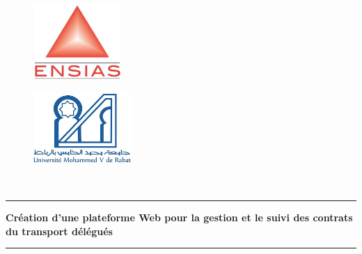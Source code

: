 \documentclass[a4paper]{report}
\begin{document}
\begin{titlepage}
	\begin{center}
		\begin{figure}[!h]
			\vspace{- 2 cm}
			\hspace{ 0 cm}
			\includegraphics[width=9em]{images/ensias.jpeg}
		\end{figure}
		\begin{figure}[!h]
			\vspace{- 3.34cm}
			\hspace{15cm}
			\includegraphics[width=10em]{images/um5.jpeg}
		\end{figure}
	\end{center}

	\begin{center}
		\begin{center}
			\noindent {}\\
		\end{center}
		\begin{center}
			\rule{0.9\linewidth}{1pt}
		\end{center}
		\vspace*{0.2cm}
		\noindent \hspace{ 0.3 cm }\Huge \textbf{Création d'une
			plateforme Web pour la gestion et le suivi des contrats du transport
			délégués}
		\begin{center}
			\rule{0.9\linewidth}{1pt}
		\end{center}


\end{center}
\end{titlepage}
\end{document}
